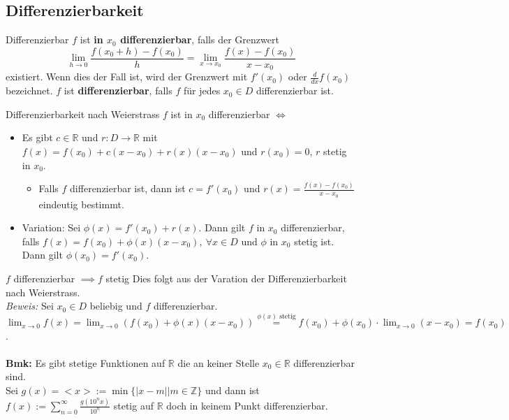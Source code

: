 \documentclass[a4paper,fontsize = 7pt]{scrartcl}
\def\limxo{\lim_{x\to 0}}
\def\sumn{\sum_{n=0}^\infty}
\def\Z{\mathbb{Z}}
\def\R{\mathbb{R}}
\begin{document}
\subsection{Differenzierbarkeit}
\begin{mainbox}{Differenzierbar}
  \vspace{-4pt}
 $f$ ist \textbf{in $x_0$ differenzierbar}, falls der Grenzwert $$\lim_{h \to 0} \frac{f(x_0 + h) - f(x_0)}{h} = \lim_{x\to x_0} \frac{f(x) - f(x_0)}{x - x_0}$$ existiert. Wenn dies der Fall ist, wird der Grenzwert mit $f'(x_0)$ oder $\frac{d}{dx}f(x_0)$ bezeichnet. $f$ ist \textbf{differenzierbar}, falls $f$ für jedes $x_0 \in D$ differenzierbar ist.
 \vspace{-4pt}
\end{mainbox}
\begin{subbox}{Differenzierbarkeit nach Weierstrass}
  \vspace{-4pt}
  $f$ ist in $x_0$ differenzierbar $\iff$ 
 \begin{itemize}
  \item Es gibt $c \in \R$ und $r: D \to \R$ mit $f(x) = f(x_0) + c(x - x_0) + r(x) (x - x_0)$ und $r(x_0) = 0$, $r$ stetig in $x_0$. 
  \begin{itemize}
  \item Falls $f$ differenzierbar ist, dann ist $c = f'(x_0)$ und $r(x) = \frac{f(x) - f(x_0)}{x - x_0}$ eindeutig bestimmt.
  \end{itemize}
  \item Variation: Sei $\phi(x) = f'(x_0) + r(x)$. Dann gilt $f$ in $x_0$ differenzierbar, falls $f(x) = f(x_0) + \phi(x) (x-x_0), \ \forall x \in D$ und $\phi$ in $x_0$ stetig ist.
  Dann gilt $\phi(x_0) = f'(x_0)$.
  
 \end{itemize} 
 \vspace{-4pt}
\end{subbox}

\begin{subbox}{$f$ differenzierbar $\implies f$ stetig}
  \vspace{-4pt}
  Dies folgt aus der Varation der Differenzierbarkeit nach Weierstrass.
  \\\textit{Beweis:} Sei $x_0 \in D$ beliebig und $f$ differenzierbar.
  $\limxo f(x) = \limxo (f(x_0) + \phi(x)(x - x_0)) \overset{\phi(x) \text{ stetig}}{=} f(x_0) + \phi(x_0) \cdot \limxo(x - x_0) = f(x_0)$.
  \\ \\\textbf{Bmk:} Es gibt stetige Funktionen auf $\R$ die an keiner Stelle $x_0 \in \R$ differenzierbar sind.
  \\ Sei $g(x) = <x> := \min \{|x-m|\vert m \in \Z\}$ und dann ist $f(x) := \sumn \frac{g(10^nx)}{10^n}$ stetig auf $\R$ doch in keinem Punkt differenzierbar.
  \vspace{-4pt}
\end{subbox}
\end{document}
